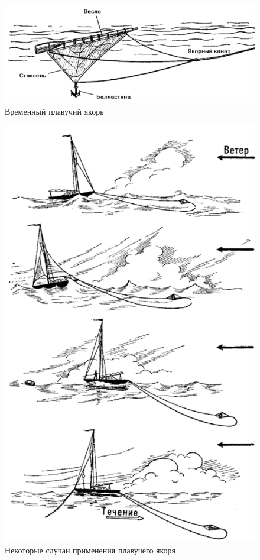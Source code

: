 \documentclass[a4paper, 12pt, twoside, final]{scrbook}
\begin{document}
\begin{figure}[htbp]
   \centering
   \includegraphics{119_Vrem_plav_yakor} %
   \caption{Временный плавучий якорь}
   \label{fig:119}
\end{figure}

\begin{figure}[htbp]
   \centering
   \includegraphics{118_Plav_yakor} %
   \caption{Некоторые случаи применения плавучего якоря}
   \label{fig:118}
\end{figure}
\end{document}
